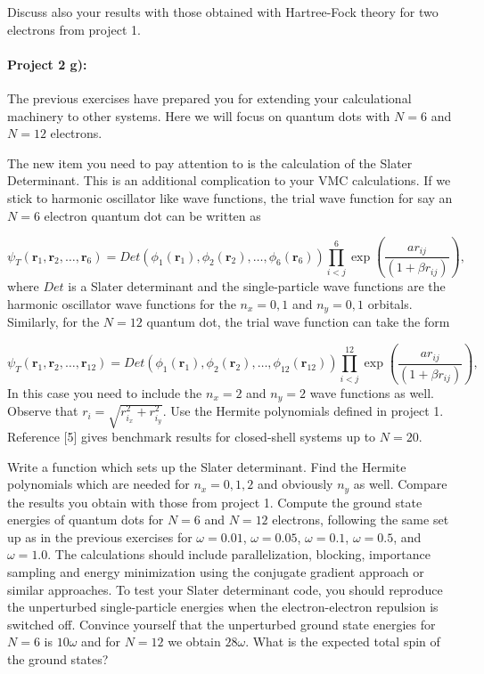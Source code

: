 \documentclass[%
oneside,                 %
final,                   %
10pt]{article}
\begin{document}
Discuss also your results with those obtained with Hartree-Fock theory for two electrons from project 1. 

\paragraph{Project 2 g):}
The previous exercises have prepared you for extending your calculational machinery  to other systems.
Here we will focus on quantum dots with $N=6$ and $N=12$ electrons.

The new item you need to pay attention to is the calculation of the Slater Determinant. This is an additional complication
to your VMC calculations.  
If we stick to harmonic oscillator like wave functions,
the trial wave function for say an $N=6$ electron quantum dot can be written as

\begin{equation}
   \psi_{T}(\bm{r}_1,\bm{r}_2,\dots, \bm{r}_6) = 
   Det\left(\phi_{1}(\bm{r}_1),\phi_{2}(\bm{r}_2),
   \dots,\phi_{6}(\bm{r}_6)\right)
   \prod_{i<j}^{6}\exp{\left(\frac{a r_{ij}}{(1+\beta r_{ij})}\right)}, 
\end{equation}
where $Det$ is a Slater determinant and the single-particle wave functions
are the harmonic oscillator wave functions for the $n_x=0,1$ and $n_y=0,1$ orbitals. 
Similarly, for the $N=12$ quantum dot, the trial wave function can take the form

\begin{equation}
   \psi_{T}(\bm{r}_1,\bm{r}_2, \dots,\bm{r}_{12}) = 
   Det\left(\phi_{1}(\bm{r}_1),\phi_{2}(\bm{r}_2),
   \dots,\phi_{12}(\bm{r}_{12})\right)
   \prod_{i<j}^{12}\exp{\left(\frac{ar_{ij}}{(1+\beta r_{ij})}\right)}, 
\end{equation}
In this case you need to include the $n_x=2$ and $n_y=2$ wave functions as well.
Observe that $r_i = \sqrt{r_{i_x}^2+r_{i_y}^2}$.  Use the Hermite polynomials defined in project 1. Reference [5] gives benchmark results for closed-shell systems up to $N=20$. 


Write a function which sets up the Slater determinant. Find the Hermite polynomials which are needed for $n_x=0,1,2$ and obviously $n_y$ as well.  Compare the results you obtain with those from project 1.
Compute the ground state energies of quantum dots for $N=6$ and $N=12$ electrons, following the same set up as in the previous exercises for $\omega=0.01$, $\omega=0.05$,
$\omega=0.1$, $\omega=0.5$, and $\omega=1.0$.
The calculations should include  parallelization, blocking, importance sampling and energy minimization using the conjugate gradient approach or similar approaches.
To test your Slater determinant code, you should reproduce the unperturbed single-particle energies
when the electron-electron repulsion is switched off. Convince yourself that the unperturbed ground state energies for $N=6$ is $10\omega$ and for $N=12$ we obtain $28\omega$. What is the expected total 
spin of the ground states?
\end{document}
